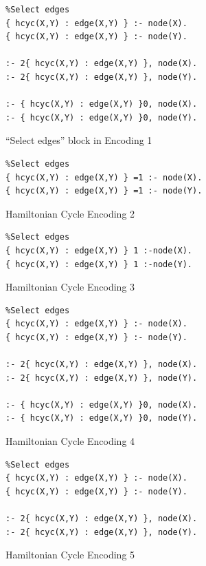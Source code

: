 \documentclass{new_tlp}
\begin{document}
\begin{figure}[!h]
\figrule
\begin{center}
\begin{verbatim}
%Select edges
{ hcyc(X,Y) : edge(X,Y) } :- node(X).
{ hcyc(X,Y) : edge(X,Y) } :- node(Y).

:- 2{ hcyc(X,Y) : edge(X,Y) }, node(X).
:- 2{ hcyc(X,Y) : edge(X,Y) }, node(Y).

:- { hcyc(X,Y) : edge(X,Y) }0, node(X).
:- { hcyc(X,Y) : edge(X,Y) }0, node(Y).
\end{verbatim}
\end{center}
\figrule
\caption{``Select edges'' block in Encoding 1}\label{enc1}
\end{figure}
\begin{figure}[!h]
\figrule
\begin{center}
\begin{verbatim}
%Select edges
{ hcyc(X,Y) : edge(X,Y) } =1 :- node(X).
{ hcyc(X,Y) : edge(X,Y) } =1 :- node(Y).
\end{verbatim}
\end{center}
\figrule
\caption{Hamiltonian Cycle Encoding 2}\label{enc2}
\end{figure}
\begin{figure}[!h]
\figrule
\begin{center}
\begin{verbatim}
%Select edges
{ hcyc(X,Y) : edge(X,Y) } 1 :-node(X).
{ hcyc(X,Y) : edge(X,Y) } 1 :-node(Y).
\end{verbatim}
\end{center}
\figrule
\caption{Hamiltonian Cycle Encoding 3}\label{enc3}
\end{figure}
\begin{figure}
\figrule
\begin{center}
\begin{verbatim}
%Select edges
{ hcyc(X,Y) : edge(X,Y) } :- node(X).
{ hcyc(X,Y) : edge(X,Y) } :- node(Y).

:- 2{ hcyc(X,Y) : edge(X,Y) }, node(X).
:- 2{ hcyc(X,Y) : edge(X,Y) }, node(Y).

:- { hcyc(X,Y) : edge(X,Y) }0, node(X).
:- { hcyc(X,Y) : edge(X,Y) }0, node(Y).
\end{verbatim}
\end{center}
\figrule
\caption{Hamiltonian Cycle Encoding 4}\label{enc4}
\end{figure}
\begin{figure}[!h]
\figrule
\begin{center}
\begin{verbatim}
%Select edges
{ hcyc(X,Y) : edge(X,Y) } :- node(X).
{ hcyc(X,Y) : edge(X,Y) } :- node(Y).

:- 2{ hcyc(X,Y) : edge(X,Y) }, node(X).
:- 2{ hcyc(X,Y) : edge(X,Y) }, node(Y).
\end{verbatim}
\end{center}
\figrule
\caption{Hamiltonian Cycle Encoding 5}\label{enc5}
\end{figure}
\end{document}
